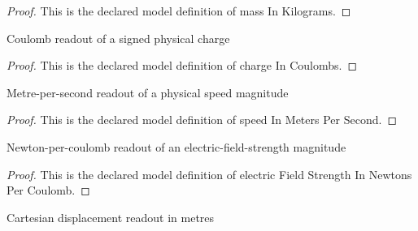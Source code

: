 \begin{proof}
  This is the declared model definition of mass In Kilograms.
\end{proof}
\begin{definition}
  \label{def:physics:phyx-mini-0837:phyxminiproblems-problemphyxmini0837-chargeincoulombs}
  Coulomb readout of a signed physical charge
\end{definition}
\begin{proof}
  This is the declared model definition of charge In Coulombs.
\end{proof}
\begin{definition}
  \label{def:physics:phyx-mini-0837:phyxminiproblems-problemphyxmini0837-speedinmeterspersecond}
  Metre-per-second readout of a physical speed magnitude
\end{definition}
\begin{proof}
  This is the declared model definition of speed In Meters Per Second.
\end{proof}
\begin{definition}
  \label{def:physics:phyx-mini-0837:phyxminiproblems-problemphyxmini0837-electricfieldstrengthinnewtonspercoulomb}
  Newton-per-coulomb readout of an electric-field-strength magnitude
\end{definition}
\begin{proof}
  This is the declared model definition of electric Field Strength In Newtons Per Coulomb.
\end{proof}
\begin{definition}
  \label{def:physics:phyx-mini-0837:phyxminiproblems-problemphyxmini0837-displacementinmeters}
  Cartesian displacement readout in metres
\end{definition}
